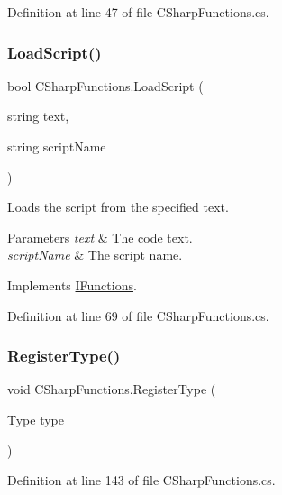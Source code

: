 Definition at line 47 of file C\+Sharp\+Functions.\+cs.

\mbox{\label{class_c_sharp_functions_a547a7d8ed518aa7395920c07ad59d0f4}} 
\subsubsection{\texorpdfstring{Load\+Script()}{LoadScript()}}
{\footnotesize\ttfamily bool C\+Sharp\+Functions.\+Load\+Script (\begin{DoxyParamCaption}\item[{string}]{text,  }\item[{string}]{script\+Name }\end{DoxyParamCaption})}



Loads the script from the specified text. 


\begin{DoxyParams}{Parameters}
{\em text} & The code text.\\
\hline
{\em script\+Name} & The script name.\\
\hline
\end{DoxyParams}


Implements \hyperlink{interface_i_functions_acdee59b5855ab9e87fcf11e3cdf9c967}{I\+Functions}.



Definition at line 69 of file C\+Sharp\+Functions.\+cs.

\mbox{\label{class_c_sharp_functions_aaff47aec44f8092d6686bfe8f1dd0647}} 
\subsubsection{\texorpdfstring{Register\+Type()}{RegisterType()}}
{\footnotesize\ttfamily void C\+Sharp\+Functions.\+Register\+Type (\begin{DoxyParamCaption}\item[{Type}]{type }\end{DoxyParamCaption})}



Definition at line 143 of file C\+Sharp\+Functions.\+cs.



